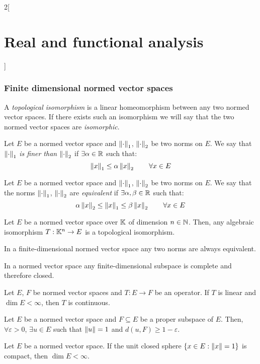 \documentclass[../../../main_math.tex]{subfiles}
\begin{document}
\begin{multicols}{2}[\section{Real and functional analysis}]
  \subsubsection{Finite dimensional normed vector spaces}
  \begin{definition}
    A \emph{topological isomorphism} is a linear homeomorphism between any two normed vector spaces. If there exists such an isomorphism we will say that the two normed vector spaces are \emph{isomorphic}.
  \end{definition}
  \begin{definition}
    Let $E$ be a normed vector space and $\left\|\cdot\right\|_1$, $\left\|\cdot\right\|_2$ be two norms on $E$. We say that $\left\|\cdot\right\|_1$ \emph{is finer than} $\left\|\cdot\right\|_2$ if $\exists\alpha\in\mathbb{R}$ such that: $$\left\|x\right\|_1\leq\alpha\left\|x\right\|_2\qquad \forall x\in E$$
  \end{definition}
  \begin{definition}
    Let $E$ be a normed vector space and $\left\|\cdot\right\|_1$, $\left\|\cdot\right\|_2$ be two norms on $E$. We say that the norms $\left\|\cdot\right\|_1$, $\left\|\cdot\right\|_2$ are \emph{equivalent} if $\exists\alpha,\beta\in\mathbb{R}$ such that: $$\alpha\left\|x\right\|_2\leq \left\|x\right\|_1\leq\beta\left\|x\right\|_2\qquad \forall x\in E$$
  \end{definition}
  \begin{theorem}
    Let $E$ be a normed vector space over $\mathbb{K}$ of dimension $n\in\mathbb{N}$. Then, any algebraic isomorphism $T:\mathbb{K}^n\rightarrow E$ is a topological isomorphism.
  \end{theorem}
  \begin{corollary}
    In a finite-dimensional normed vector space any two norms are always equivalent.
  \end{corollary}
  \begin{corollary}
    In a normed vector space any finite-dimensional subspace is complete and therefore closed.
  \end{corollary}
  \begin{corollary}
    Let $E$, $F$ be normed vector spaces and $T:E\rightarrow F$ be an operator. If $T$ is linear and $\dim E<\infty$, then $T$ is continuous.
  \end{corollary}
  \begin{lemma}
    Let $E$ be a normed vector space and $F\subseteq E$ be a proper subspace of $E$. Then, $\forall \varepsilon>0$, $\exists u\in E$ such that $\left\|u\right\|=1$ and $d(u,F)\geq 1-\varepsilon$.
  \end{lemma}
  \begin{theorem}
    Let $E$ be a normed vector space. If the unit closed sphere $\{x\in E:\left\|x\right\|=1\}$ is compact, then $\dim E<\infty$.
  \end{theorem}

\end{multicols}
\end{document}
